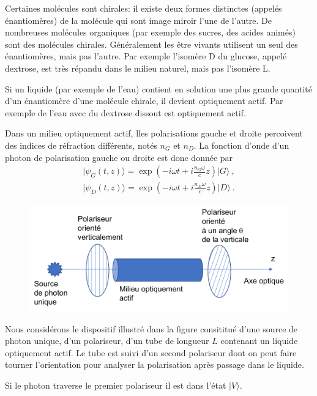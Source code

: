 Certaines molécules sont chirales: il existe deux formes distinctes (appelés énantiomères) de la molécule qui sont image miroir l'une de l'autre. De nombreuses molécules organiques (par exemple des sucres, des acides animés) sont des molécules chirales. Généralement les être vivants utilisent un seul des énantiomères, mais pas l'autre. Par exemple l'isomère D du glucose, appelé dextrose, est très répandu dans le milieu naturel, mais pas l'isomère L.

Si un liquide (par exemple de l'eau) contient en solution une plus grande quantité d'un énantiomère d'une molécule chirale, il devient optiquement actif. Par exemple de l'eau avec du dextrose dissout est optiquement actif.

Dans un milieu optiquement actif, lles polarisations gauche et droite percoivent des indices de réfraction différents, notés $n_G$ et $n_D$.
La fonction d'onde d'un photon de polarisation gauche ou droite est donc donnée par
\begin{eqnarray}
\vert \psi_G(t,z)\rangle  = \exp \left( -i \omega t + i \frac{n_G \omega}{c} z\right) \vert G\rangle  \ , \nonumber\\
 \vert  \psi_D(t,z)  \rangle =  \exp \left(  -i \omega t + i \frac{n_D \omega}{c} z \right) \vert D\rangle \  .
 \label{eq:psiGD}
\end{eqnarray}




\begin{figure}
\centering
\includegraphics[scale=0.8]{Pictures/Fig-Pol.pdf}
\end{figure}

Nous considérons le dispositif illustré dans la figure consititué d'une source de photon unique, d'un polariseur, d'un tube de longueur $L$ contenant un liquide optiquement actif. Le tube est suivi d'un second polariseur dont on peut faire tourner l'orientation pour analyser la polarisation après passage dans le liquide.

Si le photon traverse le premier polariseur il est dans l'état $\vert V \rangle$.

